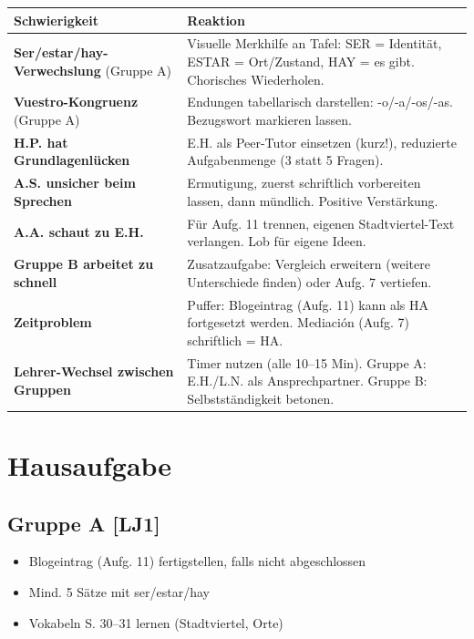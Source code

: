 \documentclass[11pt,a4paper]{article}
\begin{document}
\begin{tabular}{|p{4cm}|p{9cm}|}
\hline
\textbf{Schwierigkeit} & \textbf{Reaktion} \\
\hline
\textbf{Ser/estar/hay-Verwechslung} (Gruppe A) & Visuelle Merkhilfe an Tafel: SER = Identität, ESTAR = Ort/Zustand, HAY = es gibt. Chorisches Wiederholen. \\
\hline
\textbf{Vuestro-Kongruenz} (Gruppe A) & Endungen tabellarisch darstellen: -o/-a/-os/-as. Bezugswort markieren lassen. \\
\hline
\textbf{H.P. hat Grundlagenlücken} & E.H. als Peer-Tutor einsetzen (kurz!), reduzierte Aufgabenmenge (3 statt 5 Fragen). \\
\hline
\textbf{A.S. unsicher beim Sprechen} & Ermutigung, zuerst schriftlich vorbereiten lassen, dann mündlich. Positive Verstärkung. \\
\hline
\textbf{A.A. schaut zu E.H.} & Für Aufg. 11 trennen, eigenen Stadtviertel-Text verlangen. Lob für eigene Ideen. \\
\hline
\textbf{Gruppe B arbeitet zu schnell} & Zusatzaufgabe: Vergleich erweitern (weitere Unterschiede finden) oder Aufg. 7 vertiefen. \\
\hline
\textbf{Zeitproblem} & Puffer: Blogeintrag (Aufg. 11) kann als HA fortgesetzt werden. Mediación (Aufg. 7) schriftlich = HA. \\
\hline
\textbf{Lehrer-Wechsel zwischen Gruppen} & Timer nutzen (alle 10--15 Min). Gruppe A: E.H./L.N. als Ansprechpartner. Gruppe B: Selbstständigkeit betonen. \\
\hline
\end{tabular}

\section{Hausaufgabe}

\subsection{Gruppe A [LJ1]}
\begin{itemize}
    \item Blogeintrag (Aufg. 11) fertigstellen, falls nicht abgeschlossen
    \item Mind. 5 Sätze mit ser/estar/hay
    \item Vokabeln S. 30--31 lernen (Stadtviertel, Orte)
\end{itemize}
\end{document}
